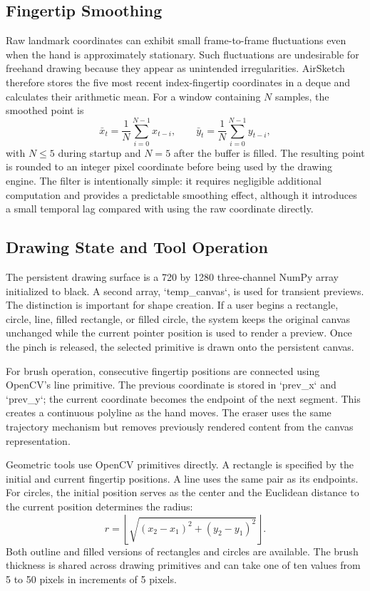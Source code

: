 \documentclass[conference]{IEEEtran}
\begin{document}
\subsection{Fingertip Smoothing}
Raw landmark coordinates can exhibit small frame-to-frame fluctuations even when the hand is approximately stationary. Such fluctuations are undesirable for freehand drawing because they appear as unintended irregularities. AirSketch therefore stores the five most recent index-fingertip coordinates in a deque and calculates their arithmetic mean. For a window containing $N$ samples, the smoothed point is
\begin{equation}
 \bar{x}_t = \frac{1}{N}\sum_{i=0}^{N-1}x_{t-i}, \qquad
 \bar{y}_t = \frac{1}{N}\sum_{i=0}^{N-1}y_{t-i},
\end{equation}
with $N\leq5$ during startup and $N=5$ after the buffer is filled. The resulting point is rounded to an integer pixel coordinate before being used by the drawing engine. The filter is intentionally simple: it requires negligible additional computation and provides a predictable smoothing effect, although it introduces a small temporal lag compared with using the raw coordinate directly.

\subsection{Drawing State and Tool Operation}
The persistent drawing surface is a 720 by 1280 three-channel NumPy array initialized to black. A second array, `temp\_canvas`, is used for transient previews. The distinction is important for shape creation. If a user begins a rectangle, circle, line, filled rectangle, or filled circle, the system keeps the original canvas unchanged while the current pointer position is used to render a preview. Once the pinch is released, the selected primitive is drawn onto the persistent canvas.

For brush operation, consecutive fingertip positions are connected using OpenCV's line primitive. The previous coordinate is stored in `prev\_x` and `prev\_y`; the current coordinate becomes the endpoint of the next segment. This creates a continuous polyline as the hand moves. The eraser uses the same trajectory mechanism but removes previously rendered content from the canvas representation.

Geometric tools use OpenCV primitives directly. A rectangle is specified by the initial and current fingertip positions. A line uses the same pair as its endpoints. For circles, the initial position serves as the center and the Euclidean distance to the current position determines the radius:
\begin{equation}
 r = \left\lfloor\sqrt{(x_2-x_1)^2+(y_2-y_1)^2}\right\rfloor.
\end{equation}
Both outline and filled versions of rectangles and circles are available. The brush thickness is shared across drawing primitives and can take one of ten values from 5 to 50 pixels in increments of 5 pixels.
\end{document}
